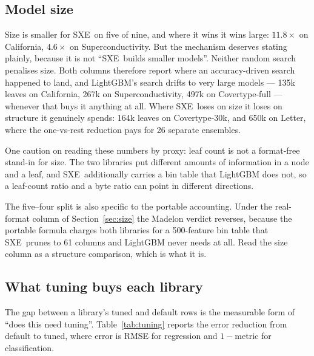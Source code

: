 \documentclass[11pt,a4paper]{article}
\newcommand{\SXE}{\textsc{SXE}}
\theoremstyle{definition}
\begin{document}
\subsection{Model size}

Size is smaller for \SXE\ on five of nine, and where it wins it wins large:
$11.8\times$ on California, $4.6\times$ on Superconductivity. But the
mechanism deserves stating plainly, because it is not ``\SXE\ builds smaller
models''. Neither random search penalises size. Both columns therefore report
where an accuracy-driven search happened to land, and LightGBM's search drifts
to very large models --- 135k leaves on California, 267k on Superconductivity,
497k on Covertype-full --- whenever that buys it anything at all. Where \SXE\
loses on size it loses on structure it genuinely spends: 164k leaves on
Covertype-30k, and 650k on Letter, where the one-vs-rest reduction pays for 26
separate ensembles.

One caution on reading these numbers by proxy: leaf count is not a format-free
stand-in for size. The two libraries put different amounts of information in a
node and a leaf, and \SXE\ additionally carries a bin table that LightGBM does
not, so a leaf-count ratio and a byte ratio can point in different directions.

The five--four split is also specific to the portable accounting. Under the
real-format column of Section~\ref{sec:size} the Madelon verdict reverses,
because the portable formula charges both libraries for a 500-feature bin table
that \SXE\ prunes to 61 columns and LightGBM never needs at all. Read the size
column as a structure comparison, which is what it is.

\subsection{What tuning buys each library}\label{sec:tuninggap}

The gap between a library's tuned and default rows is the measurable form of
``does this need tuning''. Table~\ref{tab:tuning} reports the error reduction
from default to tuned, where error is RMSE for regression and $1 - \text{metric}$
for classification.
\end{document}
